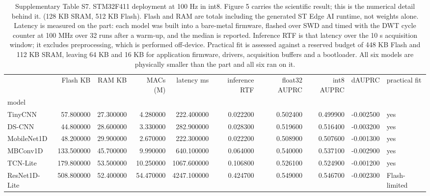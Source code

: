 \begin{table}
\caption{Supplementary Table S7. STM32F411 deployment at 100 Hz in int8. Figure 5 carries the scientific result; this is the numerical detail behind it. (128 KB SRAM, 512 KB Flash). Flash and RAM are totals including the generated ST Edge AI runtime, not weights alone. Latency is measured on the part: each model was built into a bare-metal firmware, flashed over SWD and timed with the DWT cycle counter at 100 MHz over 32 runs after a warm-up, and the median is reported. Inference RTF is that latency over the 10 s acquisition window; it excludes preprocessing, which is performed off-device. Practical fit is assessed against a reserved budget of 448 KB Flash and 112 KB SRAM, leaving 64 KB and 16 KB for application firmware, drivers, acquisition buffers and a bootloader. All six models are physically smaller than the part and all six ran on it.}
\begin{tabular}{lrrrrrrrrl}
\toprule
 & Flash KB & RAM KB & MACs (M) & latency ms & inference RTF & float32 AUPRC & int8 AUPRC & dAUPRC & practical fit \\
model &  &  &  &  &  &  &  &  &  \\
\midrule
TinyCNN & 57.800000 & 27.300000 & 4.280000 & 222.400000 & 0.022200 & 0.502400 & 0.499900 & -0.002500 & yes \\
DS-CNN & 44.800000 & 28.600000 & 3.330000 & 282.900000 & 0.028300 & 0.519600 & 0.516400 & -0.003200 & yes \\
MobileNet1D & 48.200000 & 29.900000 & 2.670000 & 222.300000 & 0.022200 & 0.508900 & 0.507600 & -0.001300 & yes \\
MBConv1D & 133.500000 & 45.700000 & 9.990000 & 640.100000 & 0.064000 & 0.540000 & 0.537100 & -0.002900 & yes \\
TCN-Lite & 179.800000 & 53.500000 & 10.250000 & 1067.600000 & 0.106800 & 0.526100 & 0.524900 & -0.001200 & yes \\
ResNet1D-Lite & 508.800000 & 52.400000 & 54.470000 & 4247.100000 & 0.424700 & 0.549000 & 0.546700 & -0.002300 & Flash-limited \\
\bottomrule
\end{tabular}
\end{table}
